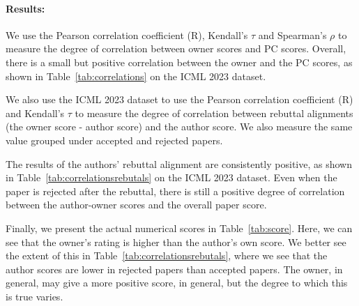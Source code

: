 \begin{minipage}[t]{\linewidth}
\paragraph{Results:}We use the Pearson correlation coefficient (R), Kendall's $\tau$ and Spearman's $\rho$ to measure the degree of correlation between owner scores and PC scores. Overall, there is a small but positive correlation between the owner and the PC scores, as shown in Table~\ref{tab:correlations} on the \textsc{ICML 2023} dataset.
\begin{table}[t]
\caption{Correlations between owner and program committee (PC) scores.}
\label{tab:correlations}
\end{table}
We also use the \textsc{ICML 2023} dataset to use the Pearson correlation coefficient (R) and Kendall's $\tau$ to measure the degree of correlation between rebuttal alignments (the owner score - author score) and the author score. We also measure the same value grouped under accepted and rejected papers.

The results of the authors' rebuttal alignment are consistently positive, as shown in Table~\ref{tab:correlationsrebutals} on the \textsc{ICML 2023} dataset. Even when the paper is rejected after the rebuttal, there is still a positive degree of correlation between the author-owner scores and the overall paper score. 

Finally, we present the actual numerical scores in Table~\ref{tab:score}. Here, we can see that the owner's rating is higher than the author's own score. We better see the extent of this in Table~\ref{tab:correlationsrebutals}, where we see that the author scores are lower in rejected papers than accepted papers. The owner, in general, may give a more positive score, in general, but the degree to which this is true varies.


\end{minipage}
